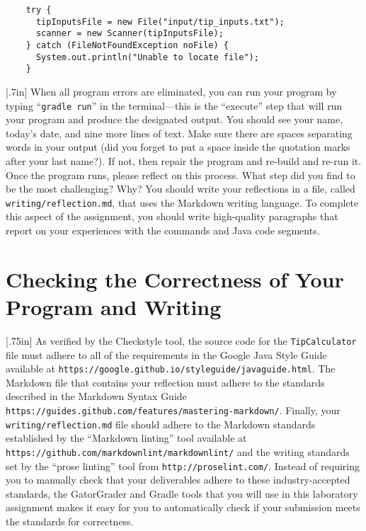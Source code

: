 \documentclass[11pt]{article}
\newcommand{\mainprogram}{\lstinline{TipCalculator}}
\newcommand{\reflection}{\lstinline{writing/reflection.md}}
\newcommand{\gradlerun}{\command{gradle run}}
\newcommand{\command}[1]{``\lstinline{#1}''}
\newcommand{\url}[1]{\lstinline{#1}}
\newcommand{\step}[1]{``{#1}''}
\newcommand{\resource}[1]{\null\hfill\LARGE{\faLink{}}\newline\scriptsize{\em{#1}}}
\newcommand{\think}[1]{\null\hfill\LARGE{\faCogs{}}\newline\scriptsize{\em{#1}}}
\begin{document}
\begin{verbatim}
    try {
      tipInputsFile = new File("input/tip_inputs.txt");
      scanner = new Scanner(tipInputsFile);
    } catch (FileNotFoundException noFile) {
      System.out.println("Unable to locate file");
    }
\end{verbatim}

\marginnote{\think{Reflect on challenges}}[.7in] When all program errors are
eliminated, you can run your program by typing \gradlerun{} in the
terminal---this is the ``execute'' step that will run your program and produce
the designated output. You should see your name, today's date, and nine more
lines of text. Make sure there are spaces separating words in your output (did
you forget to put a space inside the quotation marks after your last name?). If
not, then repair the program and re-build and re-run it. Once the program runs,
please reflect on this process. What step did you find to be the most
challenging? Why? You should write your reflections in a file, called
\reflection{}, that uses the Markdown writing language. To complete this aspect
of the assignment, you should write high-quality paragraphs that report on your
experiences with the commands and Java code segments.

\section*{Checking the Correctness of Your Program and Writing}

\marginnote{\resource{Study style guides}}[.75in] As verified by the Checkstyle
tool, the source code for the \mainprogram{} file must adhere to all of the
requirements in the Google Java Style Guide available at
\url{https://google.github.io/styleguide/javaguide.html}. The Markdown file that
contains your reflection must adhere to the standards described in the Markdown
Syntax Guide \url{https://guides.github.com/features/mastering-markdown/}.
Finally, your \reflection{} file should adhere to the Markdown standards
established by the \step{Markdown linting} tool available at
\url{https://github.com/markdownlint/markdownlint/} and the writing standards
set by the \step{prose linting} tool from \url{http://proselint.com/}. Instead
of requiring you to manually check that your deliverables adhere to these
industry-accepted standards, the GatorGrader and Gradle tools that you will use
in this laboratory assignment makes it easy for you to automatically check if
your submission meets the standards for correctness.
\end{document}
